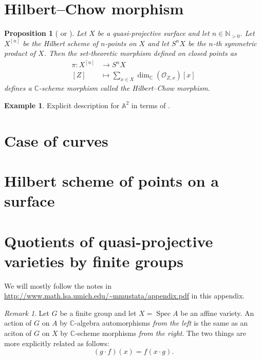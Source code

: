 \documentclass[12pt,a4paper]{amsart}
\theoremstyle{plain}
\newtheorem{prop}[thm]{Proposition}
\theoremstyle{definition}
\newtheorem{exmp}[thm]{Example}
\theoremstyle{remark}
\newtheorem{rem}[thm]{Remark}
\begin{document}
\section{Hilbert--Chow morphism}

\begin{prop}[{\cite[\S 3.2]{leh00} or \cite[p.~41]{ber08}}]
  Let $X$ be a quasi-projective surface and let $n \in \mathbb{N}_{>0}$.
  Let $X^{[n]}$ be the Hilbert scheme of $n$-points on $X$ and let $S^{n}X$ be the $n$-th symmetric product of $X$.
  Then the set-theoretic morphism defined on closed points as
  \begin{align*}
    \pi \colon X^{[n]} & \longrightarrow S^{n}X \\
    [Z] & \longmapsto \sum_{x \in X} \dim_{\mathbb{C}}(\mathscr{O}_{Z,x})[x] 
  \end{align*}
  defines a $\mathbb{C}$-scheme morphism called the \textit{Hilbert--Chow morphism}.
\end{prop}

\begin{exmp}
  Explicit description for $\mathbb{A}^{2}$ in terms of \cite[Theorem 1.9]{nak99}.
\end{exmp}



\section{Case of curves}

\section{Hilbert scheme of points on a surface}

\appendix

\section{Quotients of quasi-projective varieties by finite groups}\label{sec:quotient}

We will mostly follow the notes in \url{http://www.math.lsa.umich.edu/~mmustata/appendix.pdf} in this appendix.

\begin{rem}
  Let $G$ be a finite group and let $X = \operatorname{Spec}{A}$ be an affine variety.
  An action of $G$ on $A$ by $\mathbb{C}$-algebra automorphisms \textit{from the left} is the same as an aciton of $G$ on $X$ by $\mathbb{C}$-scheme morphisms \textit{from the right}.
  The two things are more explicitly related as follows:
  \[ (g \cdot f)(x) = f(x \cdot g). \]
\end{rem}
\end{document}
